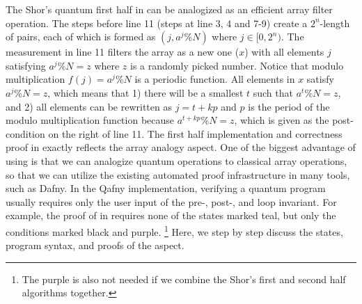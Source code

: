 The Shor's quantum first half in  can be analogized as an efficient array filter operation.
The steps before line 11 (steps at line 3, 4 and 7-9) create a $2^n$-length of pairs, each of which is formed as $(j,a^j \% N)$ where $j\in [0,2^n)$. The measurement in line 11 filters the array as a new one ($x$) with all elements $j$ satisfying $a^j \% N=z$ where $z$ is a randomly picked number. Notice that modulo multiplication $f(j)=a^j\%N$ is a periodic function. All elements in $x$ satisfy $a^j \% N=z$, which means that 1) there will be a smallest $t$ such that $a^t \% N=z$, and 2) all elements can be rewritten as $j=t+kp$ and $p$ is the period of the modulo multiplication function because $a^{t+kp} \% N=z$, which is given as the post-condition on the right of line 11.
The first half implementation and correctness proof in  exactly reflects the array analogy aspect.
One of the biggest advantage of using \qafny is that we can analogize quantum operations to classical array operations, so that we can utilize the existing automated proof infrastructure in many tools, such as Dafny.
In the Qafny implementation, verifying a quantum program usually requires only the user input of the pre-, post-, and loop invariant. For example, the proof of  in \qafny requires none of the states marked teal, but only the conditions marked black and purple. \footnote{The purple is also not needed if we combine the Shor's first and second half algorithms together.}
Here, we step by step discuss the states, program syntax, and proofs of the aspect.

